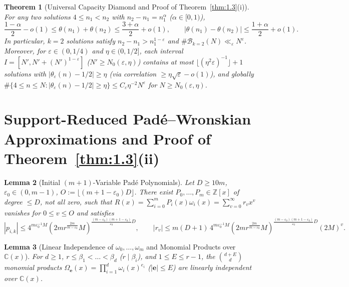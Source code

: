 \documentclass[11pt,reqno]{amsart}
\newtheorem{theorem}{Theorem}[section]
\newtheorem{lemma}[theorem]{Lemma}
\theoremstyle{remark}
\newcommand{\Z}{\mathbb{Z}}
\newcommand{\C}{\mathbb{C}}
\begin{document}
\begin{theorem}[Universal Capacity Diamond and Proof of Theorem~\ref{thm:1.3}(i)]\label{thm:6.5}
For any two solutions $4 \le n_1 < n_2$ with $n_2 - n_1 = n_1^\alpha$ ($\alpha \in [0, 1)$),
\begin{equation}\label{eq:cap-diamond}
\frac{1 - \alpha}{2} - o(1) \le \theta(n_1) + \theta(n_2) \le \frac{3 + \alpha}{2} + o(1), \qquad |\theta(n_1) - \theta(n_2)| \le \frac{1 + \alpha}{2} + o(1).
\end{equation}
In particular, $k = 2$ solutions satisfy $n_2 - n_1 > n_1^{1-\varepsilon}$ and $\#\mathcal{B}_{k=2}(N) \ll_\varepsilon N^\varepsilon$. Moreover, for $\varepsilon \in (0, 1/4)$ and $\eta \in (0, 1/2]$, each interval $I = [N', N' + (N')^{1-\varepsilon}]$ ($N' \ge N_0(\varepsilon, \eta)$) contains at most $\lfloor (\eta^2\varepsilon)^{-1} \rfloor + 1$ solutions with $|\theta_\varepsilon(n) - 1/2| \ge \eta$ (via correlation $\ge \eta\sqrt{\varepsilon} - o(1)$), and globally $\#\{4 \le n \le N : |\theta_\varepsilon(n) - 1/2| \ge \eta\} \le C_\varepsilon \eta^{-2} N^\varepsilon$ for $N \ge N_0(\varepsilon, \eta)$.
\end{theorem}

\section{Support-Reduced Pad\'e--Wronskian Approximations and Proof of Theorem~\ref{thm:1.3}(ii)}

\begin{lemma}[Initial $(m+1)$-Variable Pad\'e Polynomials]\label{lem:7.1}
Let $D \ge 10m$, $\varepsilon_0 \in (0, m - 1)$, $O := \lfloor (m + 1 - \varepsilon_0)D \rfloor$. There exist $P_0, \dots, P_m \in \Z[x]$ of degree $\le D$, not all zero, such that $R(x) = \sum_{i=0}^m P_i(x)\omega_i(x) = \sum_{v=0}^\infty r_v x^v$ vanishes for $0 \le v \le O$ and satisfies
\begin{equation}\label{eq:lem71-bd}
|p_{i,k}| \le 4^{m\varepsilon_0^{-1} M}\!\left(2 m r^{\frac{2m}{m-\varepsilon_0}} M\right)^{\frac{(m-\varepsilon_0)(m+1-\varepsilon_0)}{\varepsilon_0} D}, \qquad
|r_v| \le m(D+1)\, 4^{m\varepsilon_0^{-1} M}\!\left(2 m r^{\frac{2m}{m-\varepsilon_0}} M\right)^{\frac{(m-\varepsilon_0)(m+1-\varepsilon_0)}{\varepsilon_0} D} (2M)^v.
\end{equation}
\end{lemma}

\begin{lemma}[Linear Independence of $\omega_0, \dots, \omega_m$ and Monomial Products over $\C(x)$]\label{lem:7.2}
For $d \ge 1$, $r \le \beta_1 < \dots < \beta_d$ ($r \mid \beta_i$), and $1 \le E \le r - 1$, the $\binom{d+E}{d}$ monomial products $\Omega_{\mathbf{e}}(x) = \prod_{i=1}^d \omega_i(x)^{e_i}$ ($|\mathbf{e}| \le E$) are linearly independent over $\C(x)$.
\end{lemma}
\end{document}
